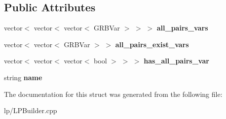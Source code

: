 \subsection*{Public Attributes}
\begin{DoxyCompactItemize}
\item 
\hypertarget{structScarab_1_1HG_1_1LatticeVars_a68c89197d9177fd5550b558358e5ac0b}{
vector$<$ vector$<$ vector$<$ GRBVar $>$ $>$ $>$ {\bfseries all\_\-pairs\_\-vars}}
\label{structScarab_1_1HG_1_1LatticeVars_a68c89197d9177fd5550b558358e5ac0b}

\item 
\hypertarget{structScarab_1_1HG_1_1LatticeVars_a2f4713dd2316790958cdca48bb6a73d1}{
vector$<$ vector$<$ GRBVar $>$ $>$ {\bfseries all\_\-pairs\_\-exist\_\-vars}}
\label{structScarab_1_1HG_1_1LatticeVars_a2f4713dd2316790958cdca48bb6a73d1}

\item 
\hypertarget{structScarab_1_1HG_1_1LatticeVars_ad6cc2ab5e0d3322d35738ddb0e9af503}{
vector$<$ vector$<$ vector$<$ bool $>$ $>$ $>$ {\bfseries has\_\-all\_\-pairs\_\-var}}
\label{structScarab_1_1HG_1_1LatticeVars_ad6cc2ab5e0d3322d35738ddb0e9af503}

\item 
\hypertarget{structScarab_1_1HG_1_1LatticeVars_a163eea64436f95f4282590c141f52b1d}{
string {\bfseries name}}
\label{structScarab_1_1HG_1_1LatticeVars_a163eea64436f95f4282590c141f52b1d}

\end{DoxyCompactItemize}


The documentation for this struct was generated from the following file:\begin{DoxyCompactItemize}
\item 
lp/LPBuilder.cpp\end{DoxyCompactItemize}
